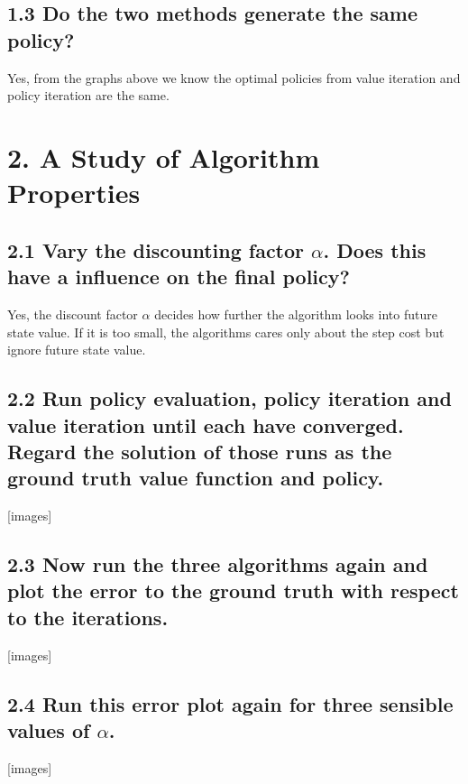 \documentclass[12pt,a4paper,titlepage]{article}
\begin{document}
\subsection*{1.3 Do the two methods generate the same policy?}
Yes, from the graphs above we know the optimal policies from value iteration and policy iteration are the same.

\section*{2. A Study of Algorithm Properties}
\subsection*{2.1 Vary the discounting factor $\alpha$. Does this have a influence on the final policy?}
Yes, the discount factor $\alpha$ decides how further the algorithm looks into future state value. If it is too small, the algorithms cares only about the step cost but ignore future state value.
\subsection*{2.2 Run policy evaluation, policy iteration and value iteration until each have converged. Regard the solution of those runs as the ground truth value function and policy.}
[images]
\subsection*{2.3 Now run the three algorithms again and plot the error to the ground truth with respect to the iterations.}
[images]
\subsection*{2.4 Run this error plot again for three sensible values of $\alpha$.}
[images]
\end{document}
